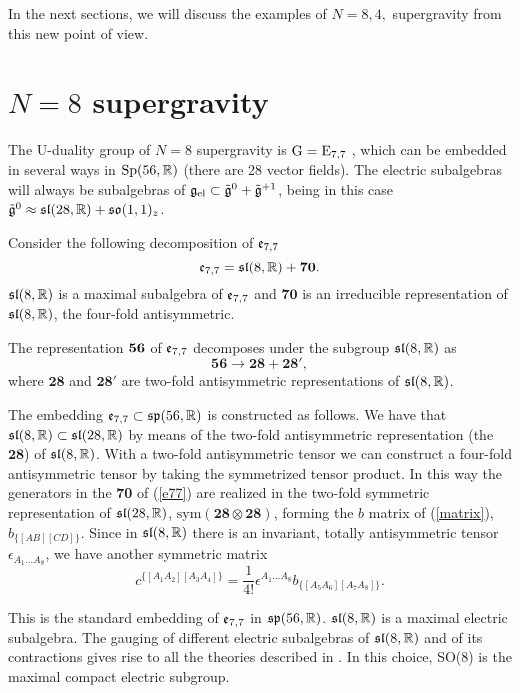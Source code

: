 \documentclass[a4paper,12pt]{article}
\begin{document}
In the next sections, we will discuss the examples of $N=8,4,$
supergravity from this new point of view.

\section{$N=8$ supergravity\label{N=8}}




The U-duality group of $N=8$ supergravity is $\mathrm{G}=\mathrm{E}_{7,7}$
\cite{cj}, which can be embedded in several ways in $\mathrm{Sp}(56,\mathbb{R})$
(there are 28 vector fields). The electric subalgebras will always
be subalgebras of $\mathfrak{g}_{\mathrm{el}}\subset
\tilde{\mathfrak{g}}^0+\tilde{\mathfrak{g}}^{+1}$, being in this case
$\tilde{\mathfrak{g}}^0\approx \mathfrak{sl}(28, \mathbb{R} ) + \mathfrak{so}(1,1)_z$.


\bigskip
 Consider the following
decomposition of $\mathfrak{e}_{7,7}$ \begin{equation}\mathfrak{e}_{7,7}=\mathfrak{sl}(8,\mathbb{R})
+ \mathbf{70} \label{e77}.\end{equation} $\mathfrak{sl}(8,\mathbb{R})$ is a maximal
subalgebra of $\mathfrak{e}_{7,7}$ and $ \mathbf{70}$ is an irreducible
representation of $\mathfrak{sl}(8,\mathbb{R})$, the four-fold antisymmetric.

The representation ${\bf 56}$ of $\mathfrak{e}_{7,7}$ decomposes under the
subgroup $\mathfrak{sl}(8,\mathbb{R})$ as $$\mathbf{56}\longrightarrow
\mathbf{28}+\mathbf{28'},$$ where $\mathbf{28}$ and $\mathbf{28'}$
are two-fold antisymmetric representations of $\mathfrak{sl}(8,\mathbb{R})$.

The embedding $\mathfrak{e}_{7,7}\subset \mathfrak{sp}(56,\mathbb{R})$ is constructed as
follows. We have that $\mathfrak{sl}(8,\mathbb{R})\subset \mathfrak{sl}(28,\mathbb{R})$ by means of
the two-fold antisymmetric representation (the $\mathbf{28}$) of
$\mathfrak{sl}(8,\mathbb{R})$.
 With
a  two-fold antisymmetric tensor we can construct a four-fold
antisymmetric tensor by taking the symmetrized tensor product. In
this way the generators in the
 {\bf 70} of (\ref{e77}) are realized in the two-fold symmetric
 representation of $\mathfrak{sl}(28,\mathbb{R})$, $\mathrm{sym}(\mathbf{28}\otimes \mathbf{28})$,
 forming the $b$ matrix of (\ref{matrix}),
 $b_{\{[AB][CD]\}}$. Since in $\mathfrak{sl}(8,\mathbb{R})$ there is
 an invariant, totally antisymmetric tensor $\epsilon_{A_1\dots
 A_8}$, we have another symmetric matrix
 $$c^{\{[A_1A_2][A_3
 A_4]\}}=\frac 1{4!}\epsilon^{A_1\dots
 A_8}b_{\{[A_5A_6][A_7
 A_8]\}}.$$






 This is the standard
embedding of $\mathfrak{e}_{7,7}$ in $\mathfrak{sp}(56,\mathbb{R})$.  $\mathfrak{sl}(8,\mathbb{R})$ is a
maximal electric subalgebra. The gauging of different electric
subalgebras of $\mathfrak{sl}(8,\mathbb{R})$ and of its contractions gives rise to
all the theories described in \cite{hw,cfgtt}. In this choice,
SO(8) is the maximal compact electric subgroup.
\end{document}
